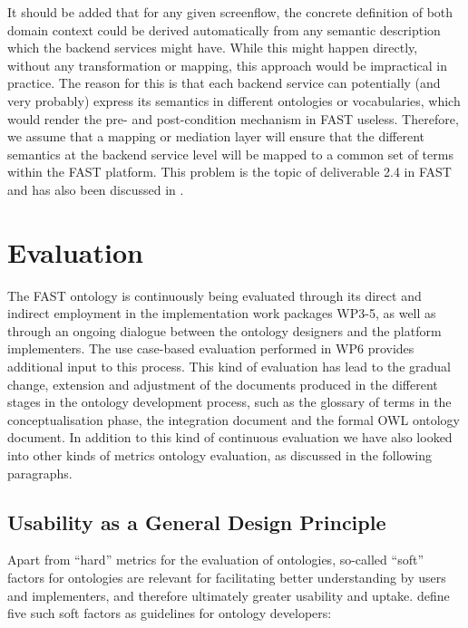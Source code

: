 \documentclass{article}
\begin{document}
It should be added that for any given screenflow, the concrete definition of both domain context could be derived automatically from any semantic description which the backend services might have. While this might happen directly, without any transformation or mapping, this approach would be impractical in practice. The reason for this is that each backend service can potentially (and very probably) express its semantics in different ontologies or vocabularies, which would render the pre- and post-condition mechanism in FAST useless. Therefore, we assume that a mapping or mediation layer will ensure that the different semantics at the backend service level will be mapped to a common set of terms within the FAST platform. This problem is the topic of deliverable 2.4 in FAST~\cite{ambrus2010fast_mediation} and has also been discussed in \cite{Ambrus:2009it}.


\clearpage
\section{Evaluation} %
\label{sec:evaluation}

The FAST ontology is continuously being evaluated through its direct and indirect employment in the implementation work packages WP3-5, as well as through an ongoing dialogue between the ontology designers and the platform implementers. The use case-based evaluation performed in WP6 provides additional input to this process. 
This kind of evaluation has lead to the gradual change, extension and adjustment of the documents produced in the different stages in the ontology development process, such as the glossary of terms in the conceptualisation phase, the integration document and the formal OWL ontology document. In addition to this kind of continuous evaluation we have also looked into other kinds of metrics ontology evaluation, as discussed in the following paragraphs.


\subsection{Usability as a General Design Principle} %
\label{sub:general_design_decisions}

Apart from ``hard'' metrics for the evaluation of ontologies, so-called ``soft'' factors for ontologies are relevant for facilitating better understanding by users and implementers, and therefore ultimately greater usability and uptake. \cite{moeller2009ontology_soft_skills} define five such soft factors as guidelines for ontology developers:
\end{document}
